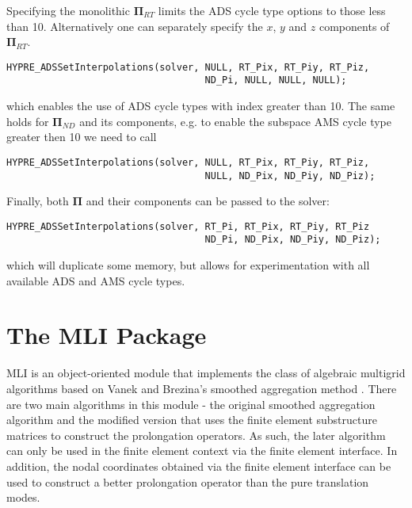 Specifying the monolithic ${\mathbf \Pi}_{RT}$ limits the ADS cycle type options
 to those less than 10. Alternatively one can separately specify the $x$, $y$
 and $z$ components of ${\mathbf \Pi}_{RT}$.
\begin{display}\begin{verbatim}
HYPRE_ADSSetInterpolations(solver, NULL, RT_Pix, RT_Piy, RT_Piz,
                                   ND_Pi, NULL, NULL, NULL);
\end{verbatim}\end{display}
which enables the use of ADS cycle types with index greater than 10. The same holds for
${\mathbf \Pi}_{ND}$ and its components, e.g. to enable the subspace AMS cycle type greater
then 10 we need to call
\begin{display}\begin{verbatim}
HYPRE_ADSSetInterpolations(solver, NULL, RT_Pix, RT_Piy, RT_Piz,
                                   NULL, ND_Pix, ND_Piy, ND_Piz);
\end{verbatim}\end{display}
Finally, both ${\mathbf \Pi}$ and their components can be passed to the solver:
\begin{display}\begin{verbatim}
HYPRE_ADSSetInterpolations(solver, RT_Pi, RT_Pix, RT_Piy, RT_Piz
                                   ND_Pi, ND_Pix, ND_Piy, ND_Piz);
\end{verbatim}\end{display}
which will duplicate some memory, but allows for experimentation with all
available ADS and AMS cycle types.


\section{The MLI Package}
                                                                                   
MLI is an object-oriented module that implements the class of algebraic
multigrid algorithms based on Vanek and Brezina's smoothed aggregation
method \cite{VaMB96, VaBM01}.  There are two main algorithms in this module - 
the original
smoothed aggregation algorithm and the modified version that uses
the finite element substructure matrices to construct the prolongation
operators.  As such, the later algorithm can only be used in the
finite element context via the finite element interface.  In addition,
the nodal coordinates obtained via the finite element interface can be
used to construct a better prolongation operator than the pure
translation modes.

